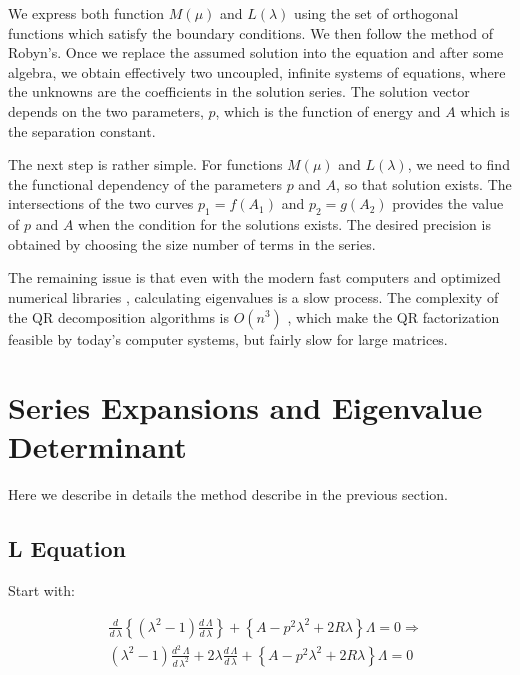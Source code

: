 We express both function $ M(\mu) $ and $ L(\lambda) $ using the set of orthogonal functions which satisfy the boundary conditions. We then follow the method of Robyn's. Once we replace the assumed solution into the equation and after some algebra, we obtain effectively two uncoupled, infinite systems of equations, where the unknowns are the coefficients in the solution series. The solution vector depends on the two parameters, $ p $, which is the function of energy and $ A $ which is the separation constant. 

The next step is rather simple. For functions $ M(\mu) $ and $ L(\lambda) $, we need to find the functional dependency of the parameters $ p $ and $ A $, so that solution exists. The intersections of the two curves $ p_1 = f(A_1) $ and $ p_2 = g(A_2) $ provides the value of $ p $ and $ A $ when the condition for the  solutions exists. The desired precision is obtained by choosing the size number of terms in the series.

The remaining issue is that even with the modern fast computers and optimized numerical libraries \cite{Lapack1}, calculating eigenvalues is a slow process. The complexity of the QR decomposition algorithms is $ O(n^3) $ \cite{QRDecomposition1}, which make the QR factorization feasible by today's computer systems, but fairly slow for large matrices.

\section{Series Expansions and Eigenvalue Determinant}

Here we describe in details the method describe in the previous section.

\subsection{L  Equation}

Start with:

\begin{equation}
\begin{split}
& \frac{d}{d\,\lambda}\left\{\left(\lambda^2-1\right)\frac{d\,\Lambda}{d\,\lambda}\right\} +
\left\{ A - p^2\lambda^2 + 2R\lambda  \right\}\Lambda = 0 \Rightarrow \\
& \left(\lambda^2-1\right)\frac{d^2\,\Lambda}{d\,\lambda^2} + 2\lambda \frac{d\,\Lambda}{d\,\lambda} + \left\{ A - p^2\lambda^2 + 2R\lambda  \right\}\Lambda = 0 
\end{split}
\end{equation}

